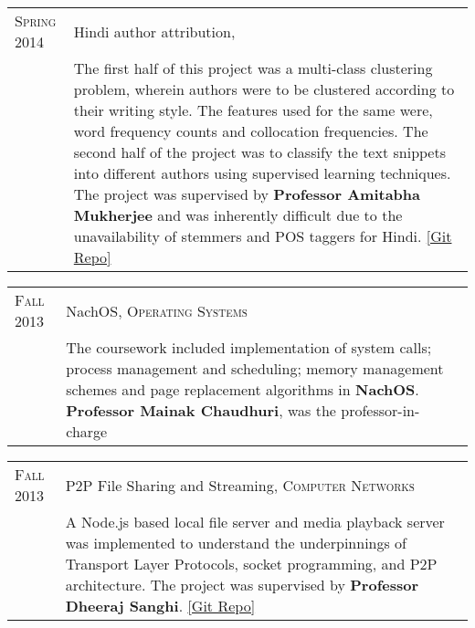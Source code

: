 \documentclass[a4paper,10pt]{article} %
\begin{document}
\begin{tabular}{>{\raggedleft}p{2.2cm}|p{15cm}}
    \textsc{Spring 2014} & Hindi author attribution, \textsc{\raggedright Artificial Intelligence} \\
                         & \footnotesize{The first half of this project was a multi-class clustering problem,
                            wherein authors were to be clustered according to their writing style.
                            The features used for the same were, word frequency counts and collocation
                            frequencies.  The second half of the project was to classify the text snippets
                            into different authors using supervised learning techniques.
                            The project was supervised by \textbf{Professor Amitabha Mukherjee} and was
                            inherently difficult due to the unavailability of stemmers and POS taggers for Hindi.
                            \href{https://github.com/srijanshetty/author-attribution} {[Git Repo]}}\\
\end{tabular}

\begin{tabular}{>{\raggedleft}p{2.2cm}|p{15cm}}
    \textsc{Fall 2013} & NachOS, \textsc{Operating Systems} \\
                       & \footnotesize{The coursework included implementation of system calls; process
                          management and scheduling; memory management schemes and page replacement
                          algorithms in \textbf{NachOS}. \textbf{Professor Mainak Chaudhuri}, was
                          the professor-in-charge}\\
\end{tabular}

\begin{tabular}{>{\raggedleft}p{2.2cm}|p{15cm}}
    \textsc{Fall 2013} & P2P File Sharing and Streaming, \textsc{Computer Networks} \\
                       & \footnotesize{A Node.js based local file server and media playback server was implemented
                          to understand the underpinnings of Transport Layer Protocols, socket programming,
                          and P2P architecture.  The project was supervised by \textbf{Professor Dheeraj Sanghi}.
                          \href{https://github.com/srijanshetty/nodesock} {[Git Repo]}}\\
\end{tabular}
\end{document}
